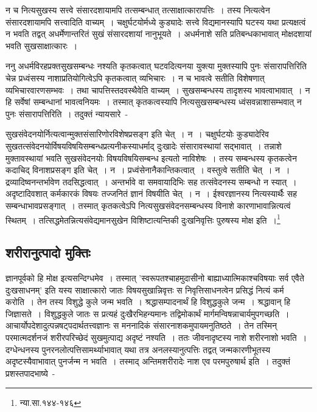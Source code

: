 		न च नित्यसुखस्य सत्त्वे संसारदशायामपि तत्सम्बन्धात् तत्साक्षात्कारापत्तिः~।‌ तस्य नित्यत्वेन संसारदशायामपि सत्त्वादिति वाच्यम्~। चक्षुर्घटयोर्मध्ये कुड्यादेः सत्त्वे विद्यमानस्यापि घटस्य यथा प्रत्यक्षत्वं न भवति तद्वत् अधर्मेणान्तरितं सुखं संसारदशायां नानुभूयते~। अधर्मनाशे सति प्रतिबन्धकाभावात् मोक्षदशायां भवति सुखसाक्षात्कारः~। 

		ननु अधर्मविरहप्रक्तसुखसम्बन्धः नश्यति कृतकत्वात् घटवदित्यनया युक्त्या मुक्तस्यापि पुनः संसारापत्तिरिति चेन्न प्रध्वंसस्य नाशाप्रतियोगित्वेऽपि कृतकत्वात् व्यभिचारः~। न च भावत्वे सतीति विशेषणात् व्यभिचारवारणसम्भवः~। तथा चापत्तिस्तदवस्थैवेति वाच्यम्~। सुखसम्बन्धस्य तादृशस्य भावत्वाभावात्~। न हि सर्वेषां सम्बन्धानां भावत्वनियमः~। तस्मात् कृतकत्वस्यापि नित्यसुखसम्बन्धस्य ध्वंसवन्नाशासम्भवात् न पुनः संसारापत्तिरिति~। तदुक्तं न्यायसारे~-

		{\fontsize{11.7}{0}\selectfont\s सुखसंवेदनयोर्नित्यत्वान्मुक्तसंसारिणोरविशेषप्रसङ्ग इति चेत्~। न~। चक्षुर्घटयोः कुड्यादेरिव सुखतत्संवेदनयोर्विषयविषयिसम्बन्धप्रत्यनीकस्याधर्माद् दुःखादेः संसारावस्थायां सद्भावात्~। तन्नाशे मुक्तावस्थायां भवति सुखसंवेदनयोः विषयविषयिसम्बन्ध इत्यतो नाविशेषः~। तस्य सम्बन्धस्य कृतकत्वेन कदाचिद् विनाशप्रसङ्ग इति चेत्~। न~। प्रध्वंसेनानैकान्तिकत्वात्~। वस्तुत्वे सतीति चेत्~। न~। द्रव्यादिष्वनन्तर्भावेण तदसिद्धत्वात्~। अन्तर्भावे वा समवायादिभिः सह तत्संवेदनस्य सम्बन्धो न स्यात्~। अदृष्टादिवशात् कर्मकारकं विषयः तज्जनितं ज्ञानं विषयीति चेत्~। न~। ईश्वरज्ञानस्य नित्यस्यार्थैः सह सम्बन्धाभावप्रसङ्गात्~। तस्मात् कृतकत्वेऽपि नित्यसुखसंवेदनसम्बन्धस्य विनाशे कारणाभावान्नित्यत्वं स्थितम्~। तत्सिद्धमेतन्नित्यसंवेद्यमानसुखेन विशिष्टात्यन्तिकी दुःखनिवृत्तिः पुरुषस्य मोक्ष इति~।\footnote{न्या.सा.१४४-१४६}}

		\subsection{शरीरानुत्पादो मुक्तिः}

		ज्ञानपूर्वको हि मोक्ष इत्यसन्दिग्धमेव~। तस्मात् 'स्वरूपतश्चाहमुदासीनो बाह्याध्यात्मिकाश्चविषयाः सर्व एवैते दुःखसाधनम्' इति यस्य साक्षात्कारो जातः विषयसुखान्निवृत्तः स निवृत्तिसाधनत्वेन प्रसिद्धं नित्यं कर्म करोति~। तेन तस्य विशुद्धे कुले जन्म भवति~। श्रद्धासम्पादनार्थं हि विशुद्धकुले जन्म~। श्रद्धावान् हि जिज्ञासते~। विशुद्धकुले जातः स प्रत्यहं दुःखैरभिहन्यमानः तद्विमोकार्थं मार्गमन्विषन्नाचार्यमुपगच्छति~। आचार्योपदेशादुत्पन्नषट्पदार्थतत्त्वज्ञानः स मननादिकं संसारनाशकमुपायमनुतिष्ठते~। तेन तस्मिन् परमात्मदर्शनजं शरीरपरिच्छेदं सुखमुत्पाद्य अदृष्टं नश्यति~। ततः जीवनादृष्टस्य नाशे शरीरनाशो भवति~। दग्धेन्धनस्य पुनरनलोत्पत्तिसामर्थ्याभावात् यथा तत्र अनलस्यानुत्पत्तिः तद्वत् जन्मकारणीभूतस्य अदृष्टस्यैवाभावात् पुनर्जन्म न भवति~। तस्माद् अन्तिमशरीरादेः नाश एव परमपुरुषार्थ इति~। तदुक्तं प्रशस्तपादभाष्ये~-

